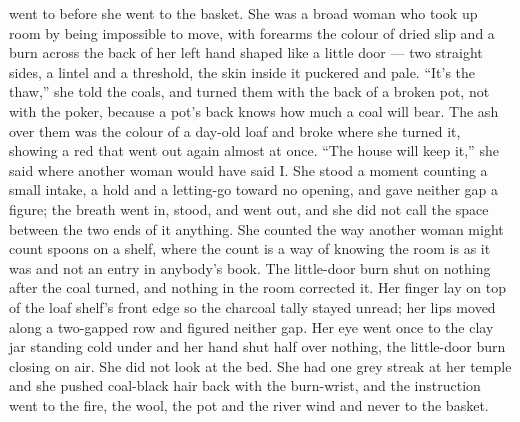  went to  before she went to the basket. She was a broad woman who took up room by being impossible to move, with forearms the colour of dried slip and a burn across the back of her left hand shaped like a little door --- two straight sides, a lintel and a threshold, the skin inside it puckered and pale. “It's the thaw,” she told the coals, and turned them with the back of a broken pot, not with the poker, because a pot's back knows how much a coal will bear. The ash over them was the colour of a day-old loaf and broke where she turned it, showing a red that went out again almost at once. “The house will keep it,” she said where another woman would have said I. She stood a moment counting a small intake, a hold and a letting-go toward no opening, and gave neither gap a figure; the breath went in, stood, and went out, and she did not call the space between the two ends of it anything. She counted the way another woman might count spoons on a shelf, where the count is a way of knowing the room is as it was and not an entry in anybody's book. The little-door burn shut on nothing after the coal turned, and nothing in the room corrected it. Her finger lay on top of the loaf shelf's front edge so the charcoal tally stayed unread; her lips moved along a two-gapped row and figured neither gap. Her eye went once to the clay jar standing cold under  and her hand shut half over nothing, the little-door burn closing on air. She did not look at the bed. She had one grey streak at her temple and she pushed coal-black hair back with the burn-wrist, and the instruction went to the fire, the wool, the pot and the river wind and never to the basket.

